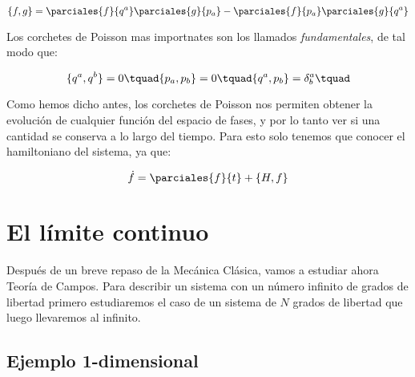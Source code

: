 \begin{equation}
    \{f,g\} = \parciales{f}{q^a}\parciales{g}{p_a}-\parciales{f}{p_a}\parciales{g}{q^a}
\end{equation}

Los corchetes de Poisson mas importnates son los llamados {\it fundamentales}, de tal modo que:

\begin{equation}
    \{ q^a,q^b \} = 0 \tquad
    \{ p_a,p_b \} = 0 \tquad
    \{ q^a,p_b \} = \delta^{a}_b \tquad
\end{equation}

Como hemos dicho antes, los corchetes de Poisson nos permiten obtener la evolución de cualquier función del espacio de fases, y por lo tanto ver si una cantidad se conserva a lo largo del tiempo. Para esto solo tenemos que conocer el hamiltoniano del sistema, ya que:
                           
\begin{equation}             
    \dot{f} = \parciales{f}{t} + \{H,f\}
\end{equation}

\section{El límite continuo}

Después de un breve repaso de la Mecánica Clásica, vamos a estudiar ahora Teoría de Campos. Para describir un sistema con un número infinito de grados de libertad primero estudiaremos el caso de un sistema de $N$ grados de libertad que luego llevaremos al infinito. 

\subsection{Ejemplo 1-dimensional}

